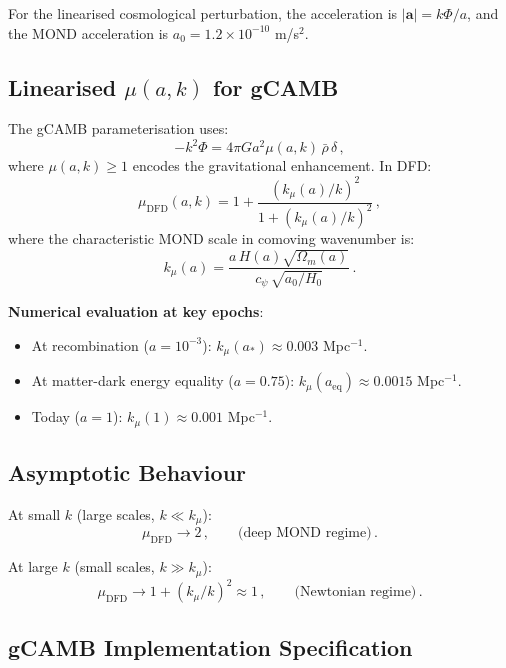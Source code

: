 \documentclass[11pt,a4paper]{article}
\begin{document}
For the linearised cosmological perturbation, the acceleration is $|\mathbf{a}| = k\Phi/a$, and the MOND acceleration is $a_0 = 1.2 \times 10^{-10}$ m/s$^2$.

\subsection{Linearised $\mu(a,k)$ for gCAMB}

The gCAMB parameterisation uses:
\begin{equation}
-k^2\Phi = 4\pi G a^2 \mu(a,k)\,\bar{\rho}\,\delta\,,
\end{equation}
where $\mu(a,k) \geq 1$ encodes the gravitational enhancement. In DFD:
\begin{equation}
\label{eq:mu-dfd}
\mu_{\mathrm{DFD}}(a,k) = 1 + \frac{(k_\mu(a)/k)^2}{1 + (k_\mu(a)/k)^2}\,,
\end{equation}
where the characteristic MOND scale in comoving wavenumber is:
\begin{equation}
k_\mu(a) = \frac{a\,H(a)\sqrt{\Omega_m(a)}}{c_\psi\,\sqrt{a_0/H_0}}\,.
\end{equation}

\textbf{Numerical evaluation at key epochs}:
\begin{itemize}
\item At recombination ($a = 10^{-3}$): $k_\mu(a_*) \approx 0.003$ Mpc$^{-1}$.
\item At matter-dark energy equality ($a = 0.75$): $k_\mu(a_{\mathrm{eq}}) \approx 0.0015$ Mpc$^{-1}$.
\item Today ($a = 1$): $k_\mu(1) \approx 0.001$ Mpc$^{-1}$.
\end{itemize}

\subsection{Asymptotic Behaviour}

At small $k$ (large scales, $k \ll k_\mu$):
\begin{equation}
\mu_{\mathrm{DFD}} \to 2\,,\qquad \text{(deep MOND regime)}\,.
\end{equation}

At large $k$ (small scales, $k \gg k_\mu$):
\begin{equation}
\mu_{\mathrm{DFD}} \to 1 + (k_\mu/k)^2 \approx 1\,,\qquad \text{(Newtonian regime)}\,.
\end{equation}

\subsection{gCAMB Implementation Specification}
\end{document}
